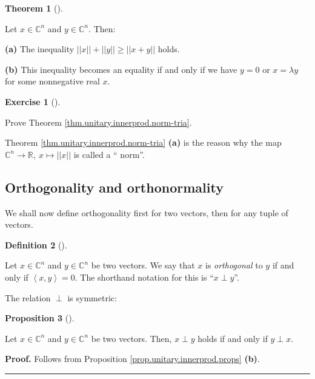 \documentclass[numbers=enddot,12pt,final,onecolumn,notitlepage]{scrartcl}%
\newcounter{exer}
\numberwithin{exer}{subsection}
\theoremstyle{definition}
\newtheorem{theo}{Theorem}[subsection]
\newenvironment{theorem}[1][]
{\begin{theo}[#1]\begin{leftbar}}
{\end{leftbar}\end{theo}}
\newtheorem{prop}[theo]{Proposition}
\newenvironment{proposition}[1][]
{\begin{prop}[#1]\begin{leftbar}}
{\end{leftbar}\end{prop}}
\newtheorem{defi}[theo]{Definition}
\newenvironment{definition}[1][]
{\begin{defi}[#1]\begin{leftbar}}
{\end{leftbar}\end{defi}}
\newtheorem{exmp}[exer]{Exercise}
\newenvironment{exercise}[1][]
{\begin{exmp}[#1]\begin{leftbar}}
{\end{leftbar}\end{exmp}}
\newenvironment{proof}[1][Proof]{\noindent\textbf{#1.} }{\ \rule{0.5em}{0.5em}}
\begin{document}
\begin{theorem}
[triangle inequality]\label{thm.unitary.innerprod.norm-tria} Let
$x\in\mathbb{C}^{n}$ and $y\in\mathbb{C}^{n}$. Then:

\textbf{(a)} The inequality $\left\vert \left\vert x\right\vert \right\vert
+\left\vert \left\vert y\right\vert \right\vert \geq\left\vert \left\vert
x+y\right\vert \right\vert $ holds.

\textbf{(b)} This inequality becomes an equality if and only if we have $y=0$
or $x=\lambda y$ for some nonnegative real $x$.
\end{theorem}

\begin{exercise}
\label{exe.unitary.innerprod.norm-tria} Prove Theorem
\ref{thm.unitary.innerprod.norm-tria}.
\end{exercise}

Theorem \ref{thm.unitary.innerprod.norm-tria} \textbf{(a)} is the reason why
the map $\mathbb{C}^{n}\rightarrow\mathbb{R},\ x\mapsto\left\vert \left\vert
x\right\vert \right\vert $ is called a \textquotedblleft
norm\textquotedblright.

\subsection{Orthogonality and orthonormality}

We shall now define orthogonality first for two vectors, then for any tuple of vectors.

\begin{definition}
\label{def.unitary.innerprod.orth}Let $x\in\mathbb{C}^{n}$ and $y\in
\mathbb{C}^{n}$ be two vectors. We say that $x$ is \emph{orthogonal} to $y$ if
and only if $\left\langle x,y\right\rangle =0$. The shorthand notation for
this is \textquotedblleft$x\perp y$\textquotedblright.
\end{definition}

The relation $\perp$ is symmetric:

\begin{proposition}
\label{prop.unitary.innerprod.orth-symm}Let $x\in\mathbb{C}^{n}$ and
$y\in\mathbb{C}^{n}$ be two vectors. Then, $x\perp y$ holds if and only if
$y\perp x$.
\end{proposition}

\begin{proof}
Follows from Proposition \ref{prop.unitary.innerprod.props} \textbf{(b)}.
\end{proof}
\end{document}
